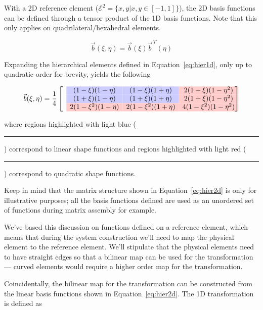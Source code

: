 \documentclass[11pt]{style/memo}
\begin{document}
With a 2D reference element ($\mathcal{E}^2 = \{x,y|x,y\in \left[-1,1\right]\}$), the
2D basis functions can be defined through a tensor product of the 1D basis functions.
Note that this only applies on quadrilateral/hexahedral elements.

\begin{equation}
    \vec{b}(\xi,\eta) = \vec{b}(\xi)\vec{b}^{\, T}(\eta)
\end{equation}

Expanding the hierarchical elements defined in Equation~\ref{eq:hier1d}, only up to
quadratic order for brevity, yields the following

\begin{equation}
    \label{eq:hier2d}
    \vec{b}(\xi,\eta) = \frac{1}{4} \begin{bmatrix}
        & \cellcolor{blue!20!white} (1-\xi)(1-\eta) & \cellcolor{blue!20!white} (1-\xi)(1+\eta) & \cellcolor{red!20!white} 2(1-\xi)(1-\eta^2) \\
        & \cellcolor{blue!20!white} (1+\xi)(1-\eta) & \cellcolor{blue!20!white} (1+\xi)(1+\eta) & \cellcolor{red!20!white} 2(1+\xi)(1-\eta^2) \\
        & \cellcolor{red!20!white} 2(1-\xi^2)(1-\eta) & \cellcolor{red!20!white} 2(1-\xi^2)(1+\eta) & \cellcolor{red!20!white} 4(1-\xi^2)(1-\eta^2)
    \end{bmatrix}
\end{equation}

where regions highlighted with light blue ({\color{blue!20!white}\rule{1em}{1em}})
correspond to linear shape functions and regions highlighted with light red
({\color{red!20!white}\rule{1em}{1em}}) correspond to quadratic shape functions.

Keep in mind that the matrix structure shown in Equation~\ref{eq:hier2d} is only for
illustrative purposes; all the basis functions defined are used as an unordered set of
functions during matrix assembly for example.

We've based this discussion on functions defined on a reference element, which means
that during the system construction we'll need to map the physical element to the
reference element. We'll stipulate that the physical elements need to have straight
edges so that a bilinear map can be used for the transformation --- curved elements
would require a higher order map for the transformation.

Coincidentally, the bilinear map for the transformation can be constructed from the
linear basis functions shown in Equation~\ref{eq:hier2d}. The 1D transformation is
defined as
\end{document}
